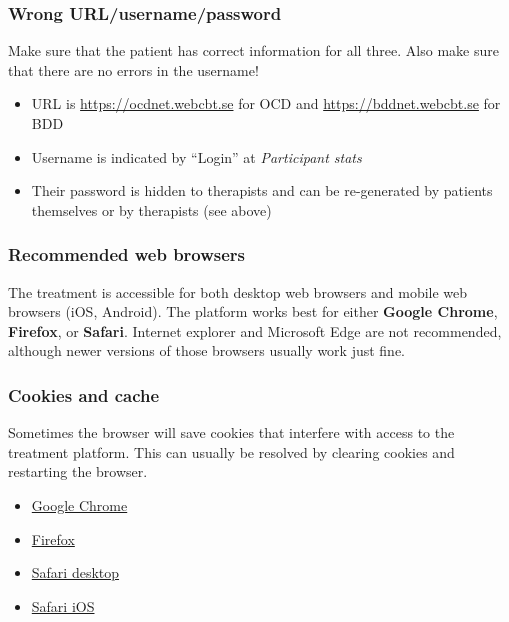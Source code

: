 \documentclass[]{book}
\providecommand{\tightlist}{%
  \setlength{\itemsep}{0pt}\setlength{\parskip}{0pt}}
\begin{document}
\hypertarget{wrong-urlusernamepassword}{%
\subsubsection{Wrong URL/username/password}\label{wrong-urlusernamepassword}}

Make sure that the patient has correct information for all three. Also make sure that there are no errors in the username!

\begin{itemize}
\tightlist
\item
  URL is \url{https://ocdnet.webcbt.se} for OCD and \url{https://bddnet.webcbt.se} for BDD
\item
  Username is indicated by ``Login'' at \emph{Participant stats}
\item
  Their password is hidden to therapists and can be re-generated by patients themselves or by therapists (see above)
\end{itemize}

\hypertarget{recommended-web-browsers}{%
\subsubsection{Recommended web browsers}\label{recommended-web-browsers}}

The treatment is accessible for both desktop web browsers and mobile web browsers (iOS, Android). The platform works best for either \textbf{Google Chrome}, \textbf{Firefox}, or \textbf{Safari}. Internet explorer and Microsoft Edge are not recommended, although newer versions of those browsers usually work just fine.

\hypertarget{cookies-and-cache}{%
\subsubsection{Cookies and cache}\label{cookies-and-cache}}

Sometimes the browser will save cookies that interfere with access to the treatment platform. This can usually be resolved by clearing cookies and restarting the browser.

\begin{itemize}
\tightlist
\item
  \href{https://support.google.com/chrome/answer/95647?co=GENIE.Platform\%3DDesktop\&hl=en}{Google Chrome}
\item
  \href{https://support.mozilla.org/en-US/kb/delete-cookies-remove-info-websites-stored}{Firefox}
\item
  \href{https://support.apple.com/kb/ph21411?locale=en_US}{Safari desktop}
\item
  \href{https://support.apple.com/en-gb/HT201265}{Safari iOS}
\end{itemize}
\end{document}
